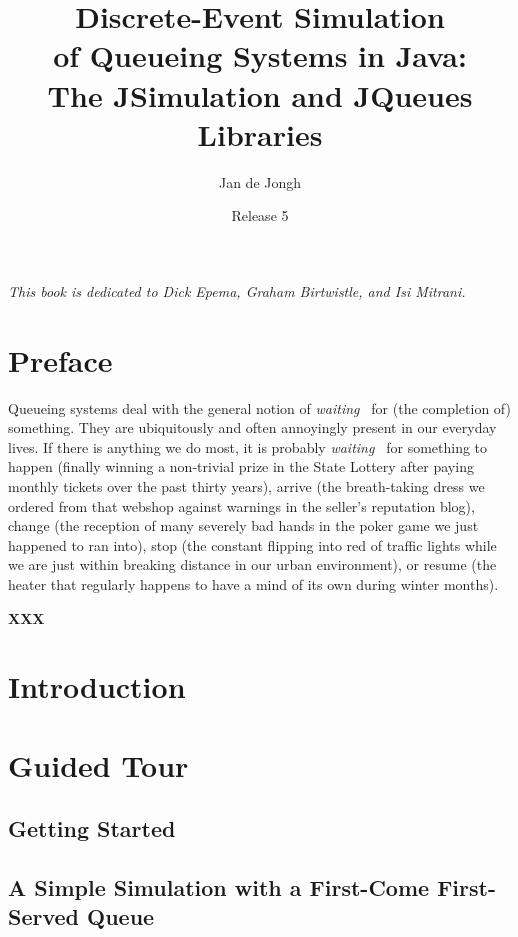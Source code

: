 \documentclass[12pt]{book}
\title{Discrete-Event Simulation\\
       of Queueing Systems in Java:\\
       The JSimulation and JQueues Libraries}
\author{Jan de Jongh}
\date{Release 5}
\begin{document}
\maketitle

\chapter*{}

{\em This book is dedicated to Dick Epema, Graham Birtwistle, and Isi Mitrani.}

\tableofcontents

\chapter{Preface}

Queueing systems deal with the general notion of {\em waiting\ }
  for (the completion of) something.
They are ubiquitously and often annoyingly present in our everyday lives.
If there is anything we do most,
  it is probably {\em waiting\ } for something to
  happen (finally winning a non-trivial prize in the State Lottery
          after paying monthly tickets over the past thirty years),
  arrive (the breath-taking dress we ordered from that webshop
          against warnings in the seller's reputation blog),
  change (the reception of many severely bad hands in the poker game
          we just happened to ran into),
  stop (the constant flipping into red of traffic lights
        while we are just within breaking distance
        in our urban environment),
  or resume (the heater that regularly happens to have
             a mind of its own during
             winter months).

{\bf XXX}

\chapter{Introduction}

\chapter{Guided Tour}

\section{Getting Started}

\section{A Simple Simulation with a First-Come First-Served Queue}
\end{document}
